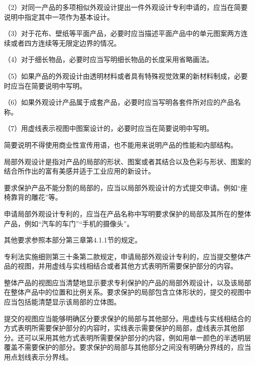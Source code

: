 {\setlength{\parindent}{17.1bp}（2）对同一产品的多项相似外观设计提出一件外观设计专利申请的，应当在简要说明中指定其中一项作为基本设计。\par}

{\setlength{\parindent}{17.1bp}（3）对于花布、壁纸等平面产品，必要时应当描述平面产品中的单元图案两方连续或者四方连续等无限定边界的情况。\par}

{\setlength{\parindent}{17.1bp}（4）对于细长物品，必要时应当写明细长物品的长度采用省略画法。\par}

{\setlength{\parindent}{17.1bp}（5）如果产品的外观设计由透明材料或者具有特殊视觉效果的新材料制成，必要时应当在简要说明中写明。\par}

{\setlength{\parindent}{17.1bp}（6）如果外观设计产品属于成套产品，必要时应当写明各套件所对应的产品名称。\par}

{\setlength{\parindent}{17.1bp}（7）用虚线表示视图中图案设计的，必要时应当在简要说明中写明。\par}

简要说明不得使用商业性宣传用语，也不能用来说明产品的性能和内部结构。

局部外观设计是指对产品的局部的形状、图案或者其结合以及色彩与形状、图案的结合所作出的富有美感并适于工业应用的新设计。

要求保护产品不能分割的局部的，应当以局部外观设计的方式提交申请。例如“座椅靠背的雕花”等。

申请局部外观设计专利的，应当在产品名称中写明要求保护的局部及其所在的整体产品，例如“汽车的车门”“手机的摄像头”。

其他要求参照本部分第三章第4.1.1节的规定。

专利法实施细则第三十条第二款规定，申请局部外观设计专利的，应当提交整体产品的视图，并用虚线与实线相结合或者其他方式表明所需要保护部分的内容。

整体产品的视图应当清楚地显示要求专利保护的产品的局部外观设计，以及该局部在整体产品中的位置和比例关系。要求保护的局部包含立体形状的，提交的视图中应当包括能清楚显示该局部的立体图。

提交的视图应当能够明确区分要求保护的局部与其他部分。用虚线与实线相结合的方式表明所需要保护部分的内容时，实线表示需要保护的局部，虚线表示其他部分。还可以采用其他方式表明所需要保护部分的内容，例如用单一颜色的半透明层覆盖不需要保护的部分。要求保护的局部与其他部分之间没有明确分界线的，应当用点划线表示分界线。


